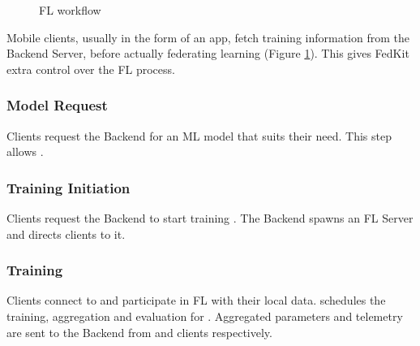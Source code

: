 \documentclass[letterpaper]{article} %
\begin{document}
\begin{figure}
\centering
{}
\caption{FL workflow}
\label{fig:fl-workflow}
\end{figure}

Mobile clients, usually in the form of an app,
fetch training information from the Backend Server,
before actually federating learning (Figure \ref{fig:fl-workflow}).
This gives FedKit extra control over the FL process.

\newcommand{\modelreq}{Model Request}
\subsubsection{\modelreq}
Clients request the Backend for an ML model \model{} that suits their need.
This step allows \backendorin.

\newcommand{\traininginit}{Training Initiation}
\subsubsection{\traininginit}
Clients request the Backend to start training \model.
The Backend spawns an FL Server \fs{} and directs clients to it.

\subsubsection{Training}
Clients connect to \fs{} and participate in FL with their local data.
\fs{} schedules the training, aggregation and evaluation for \model.
Aggregated parameters and telemetry are sent to the Backend
from \fs{} and clients respectively.
\end{document}
